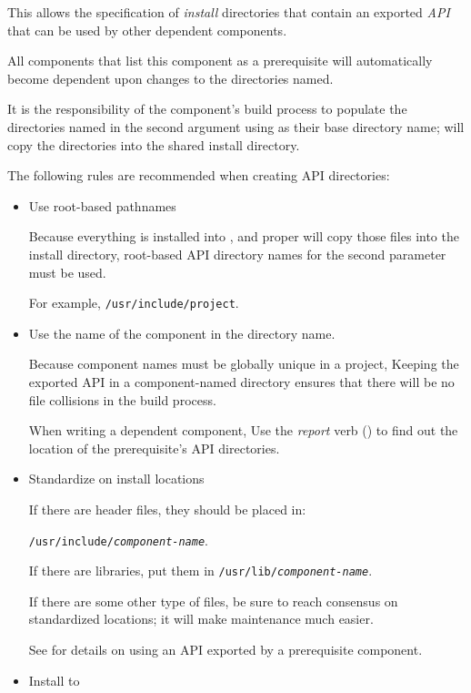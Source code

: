 This allows the specification of \emph{install} directories that
contain an exported \emph{API} that can be used by other dependent
components.

All components that list this component as a prerequisite will
automatically become dependent upon changes to the directories named.

It is the responsibility of the component's build process to populate
the directories named in the second argument using \destdir as their
base directory name; \lmsbw will copy the \destdir directories into
the shared install directory.

The following rules are recommended when creating API directories:

\begin{itemize}
\item Use root-based pathnames

  Because everything is installed into \destdir, and \lmsbw proper
  will copy those files into the install directory, root-based API
  directory names for the second parameter must be used.

  For example, \texttt{/usr/include/project}.

\item Use the name of the component in the directory name.

  Because component names must be globally unique in a project,
  Keeping the exported API in a component-named directory ensures that
  there will be no file collisions in the build process.

  When writing a dependent component, Use the \emph{report} verb
  () to find out the location of the
  prerequisite's API directories.

\item Standardize on install locations

  If there are header files, they should be placed in:

  \texttt{/usr/include/\emph{component-name}}.

  If there are libraries, put them in
  \texttt{/usr/lib/\emph{component-name}}.

  If there are some other type of files, be sure to reach consensus on
  standardized locations; it will make maintenance much easier.

  See  for details on using an API
  exported by a prerequisite component.

\item Install to \destdir


\end{itemize}
